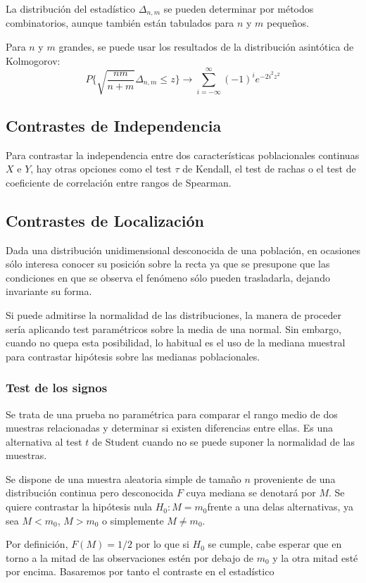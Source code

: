 \documentclass[a4paper,12pt]{article}
\begin{document}
La distribución del estadístico $\Delta_{n,m}$ se pueden determinar por métodos combinatorios, aunque también están tabulados para $n$ y $m$ pequeños.

Para $n$ y $m$ grandes, se puede usar los resultados de la distribución asintótica de Kolmogorov:
$$P\{ \sqrt{\frac{nm}{n+m}}\Delta_{n,m}\leq z\}\longrightarrow \sum^{\infty}_{i=-\infty}(-1)^i e^{-2i^2z^2}$$


\subsection{Contrastes de Independencia}
Para contrastar la independencia entre dos características poblacionales continuas $X$ e $Y$, hay otras opciones como el test $\tau$ de Kendall, el test de rachas o el test de coeficiente de correlación entre rangos de Spearman.

\subsection{Contrastes de Localización}
Dada una distribución unidimensional desconocida de una población, en ocasiones sólo interesa conocer su posición sobre la recta ya que se presupone que las condiciones en que se observa el fenómeno sólo pueden trasladarla, dejando invariante su forma.

Si puede admitirse la normalidad de las distribuciones, la manera de proceder sería aplicando test paramétricos sobre la media de una normal. Sin embargo, cuando no quepa esta posibilidad, lo habitual es el uso de la mediana muestral para contrastar hipótesis sobre las medianas poblacionales.

\subsubsection{Test de los signos}
Se trata de una prueba no paramétrica para comparar el rango medio de dos muestras relacionadas y determinar si existen diferencias entre ellas. Es una alternativa al test $t$ de Student cuando no se puede suponer la normalidad de las muestras.

Se dispone de una muestra aleatoria simple de tamaño $n$ proveniente de una distribución continua pero desconocida $F$ cuya mediana se denotará por $M$. Se quiere contrastar la hipótesis nula $H_0: M=m_0$frente a una delas alternativas, ya sea $M<m_0$, $M>m_0$ o simplemente $M\neq m_0$.

Por definición, $F(M)=1/2$ por lo que si $H_0$ se cumple, cabe esperar que en torno a la mitad de las observaciones estén por debajo de $m_0$ y la otra mitad esté por encima. Basaremos por tanto el contraste en el estadístico
\end{document}
